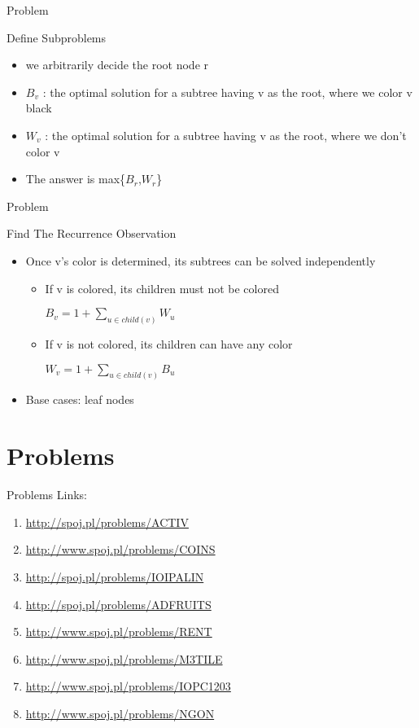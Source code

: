 \documentclass{beamer}
\begin{document}
\begin{frame}[<+->]{Problem}
  \begin{block}{Define Subproblems}
  \begin{itemize}
    \item we arbitrarily decide the root node r
    \item $B_v$ : the optimal solution for a subtree having v as the root, where we color v black
    \item $W_v$ : the optimal solution for a subtree having v as the root, where we don't color v
    \item The answer is max\{$B_r$,$W_r$\}
  \end{itemize}
  \end{block}
\end{frame}

\begin{frame}[<+->]{Problem}
  \begin{block}{Find The Recurrence}
  Observation
  \begin{itemize}
    \item Once v's color is determined, its subtrees can be solved independently\\
    \begin{itemize}
      \item If v is colored, its children must not be colored\\
	\begin{center}$B_v = 1 + \sum_{u \in child(v)} W_u$\end{center}
      \item If v is not colored, its children can have any color\\
	\begin{center}$W_v = 1 + \sum_{u \in child(v)} B_u$\end{center}
    \end{itemize}
    \item Base cases: leaf nodes
  \end{itemize}
  \end{block}
\end{frame}

\section{Problems}

\begin{frame}{Problems}
Links:
\begin{enumerate}
\item \url{http://spoj.pl/problems/ACTIV}
\item \url{http://www.spoj.pl/problems/COINS}
\item \url{http://spoj.pl/problems/IOIPALIN}
\item \url{http://spoj.pl/problems/ADFRUITS}
\item \url{http://www.spoj.pl/problems/RENT}
\item \url{http://www.spoj.pl/problems/M3TILE}
\item \url{http://www.spoj.pl/problems/IOPC1203}
\item \url{http://www.spoj.pl/problems/NGON}
\end{enumerate}
\end{frame}
\end{document}
